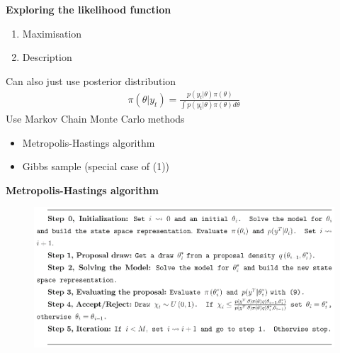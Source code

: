 \documentclass{beamer}
\begin{document}
\begin{frame}
  \textbf{Exploring the likelihood function}
  \begin{enumerate}
    \item Maximisation
    \item Description
  \end{enumerate}
  Can also just use posterior distribution
  \begin{align}
    \pi(\theta|y_t) = \frac{p(y_t|\theta)\pi(\theta)}{\int p(y_t|\theta)\pi(\theta)d\theta}
  \end{align}
  Use Markov Chain Monte Carlo methods
  \begin{itemize}
    \item Metropolis-Hastings algorithm
    \item Gibbs sample (special case of (1))
  \end{itemize}
\end{frame}

\begin{frame}
  \textbf{Metropolis-Hastings algorithm}
  \begin{figure}
    \includegraphics[scale=.8]{metropolis.eps}
  \end{figure}
\end{frame}


\end{document}
